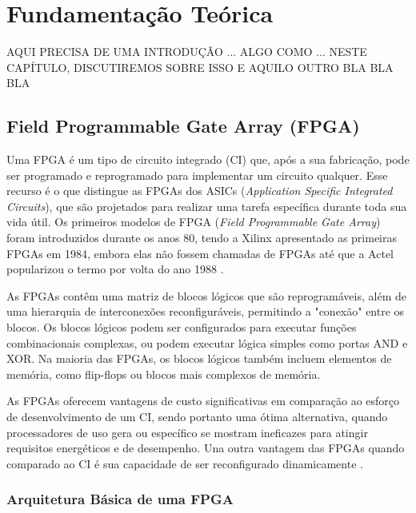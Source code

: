 \chapter{Fundamentação Teórica}
\label{cap:fundamentacao-teorica}
AQUI PRECISA DE UMA INTRODUÇÃO ... ALGO COMO ... NESTE CAPÍTULO, DISCUTIREMOS SOBRE ISSO E AQUILO OUTRO BLA BLA BLA
\section{Field Programmable Gate Array (FPGA)}\label{sec:fpga}

Uma FPGA é um tipo de circuito integrado (CI) que, após a sua fabricação, pode ser programado e reprogramado para implementar um circuito qualquer. Esse recurso é o que distingue as FPGAs dos ASICs (\textit{Application Specific Integrated Circuits}), que são projetados para realizar uma tarefa específica durante toda sua vida útil. Os primeiros modelos de FPGA (\textit{Field Programmable Gate Array}) foram introduzidos durante os anos 80, tendo a Xilinx apresentado as primeiras FPGAs em 1984, embora elas não fossem chamadas de FPGAs até que a Actel popularizou o termo por volta do ano 1988 \cite{7086413}. 

As FPGAs contêm uma matriz de blocos lógicos que são reprogramáveis, além de uma hierarquia de interconexões reconfiguráveis, permitindo a "conexão" entre os blocos. Os blocos lógicos podem ser configurados para executar funções combinacionais complexas, ou podem executar lógica simples como portas AND e XOR. Na maioria das FPGAs, os blocos lógicos também incluem elementos de memória, como flip-flops ou blocos mais complexos de memória.

As FPGAs oferecem vantagens de custo significativas em comparação ao esforço de desenvolvimento de um CI, sendo portanto uma ótima alternativa, quando processadores de uso gera ou específico se mostram ineficazes para atingir requisitos energéticos e de desempenho. Una outra vantagem das FPGAs quando comparado ao CI é sua capacidade de ser reconfigurado dinamicamente \cite{fpgaxilinx}.



\subsection{Arquitetura Básica de uma FPGA}\label{sec:fpgaarquitetura}

